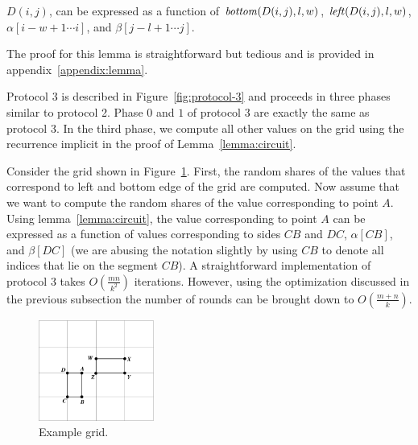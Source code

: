 \begin{lemma}
\rm
\label{lemma:circuit}
$D(i,j)$, can be expressed as a function of ${\it bottom}(D(i,j),l,w)$,
${\it left}(D(i,j),l,w)$, $ \alpha [ i-w+1 \cdots  i ]$, and $\beta [ j-l+1 \cdots j]$.
\end{lemma}
The proof for this lemma is straightforward but tedious and is provided in appendix~\ref{appendix:lemma}.


Protocol 3 is described in Figure~\ref{fig:protocol-3} and proceeds in
three phases similar to protocol 2.  Phase $0$ and $1$ of protocol 3 are
exactly the same as protocol 3. In the third phase, we compute all other
values on the grid using the recurrence implicit in the proof of
Lemma~\ref{lemma:circuit}.

Consider the grid shown in Figure~\ref{fig:grid}.  First, the random
shares of the values that correspond to left and bottom edge of the grid
are computed.  Now assume that we want to compute the random shares of
the value corresponding to point $A$. Using lemma~\ref{lemma:circuit},
the value corresponding to point $A$ can be expressed as a function of
values corresponding to sides $CB$ and $DC$, $\alpha [CB]$, and $\beta
[DC]$ (we are abusing the notation slightly by using $CB$ to denote all
indices that lie on the segment $CB$). A straightforward implementation
of protocol $3$ takes $O( \frac{mn}{k^2})$ iterations. However, using
the optimization discussed in the previous subsection the number of
rounds can be brought down to $O(\frac{m+n}{k})$.



\begin{figure}
\centering
    \includegraphics[height=1.3in]{genomics/grid.pdf}
\caption{Example grid.}
\label{fig:grid}
\end{figure}

